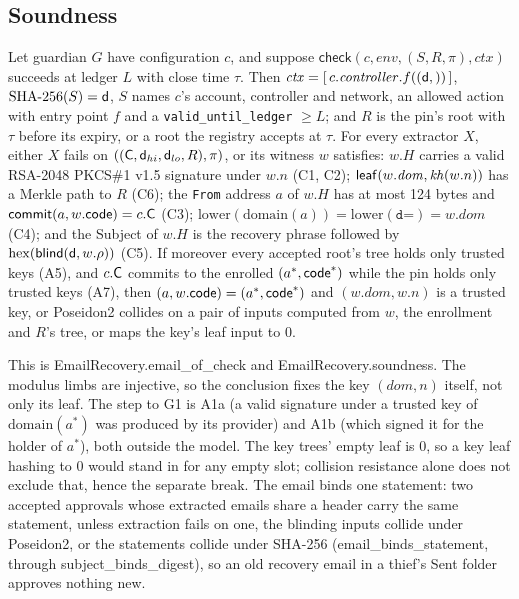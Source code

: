 \subsection{Soundness}

\begin{theorem}\label{thm:soundness}
Let guardian $G$ have configuration $c$, and suppose
$\mathsf{check}(c, \mathit{env}, (S, R, \pi), \mathit{ctx})$ succeeds at
ledger $L$ with close time $\tau$. Then $\mathit{ctx} =
[\,c.\mathit{controller}.f((\mathsf{d},))\,]$, $\mathrm{SHA\text{-}256}(S) = \mathsf{d}$, $S$ names
$c$'s account, controller and network, an allowed action with entry point
$f$ and a \texttt{valid\_until\_ledger} $\ge L$; and $R$ is the pin's root
with $\tau$ before its expiry, or a root the registry accepts at $\tau$. For
every extractor $X$, either $X$ fails on $((\mathsf{C}, \mathsf{d}_{hi},
\mathsf{d}_{lo}, R), \pi)$, or its witness $w$ satisfies: $w.H$ carries a valid
RSA-2048 PKCS\#1 v1.5 signature under $w.n$ (C1, C2);
$\mathsf{leaf}(w.\mathit{dom}, \mathit{kh}(w.n))$ has a Merkle path to $R$ (C6); the
\texttt{From} address $a$ of $w.H$ has at most 124 bytes and $\mathsf{commit}(a,
w.\mathsf{code}) = c.\mathsf{C}$ (C3); $\mathrm{lower}(\mathrm{domain}(a)) =
\mathrm{lower}(\texttt{d=}) = w.\mathit{dom}$ (C4); and the Subject of $w.H$
is the recovery phrase followed by $\mathrm{hex}(\mathsf{blind}(\mathsf{d},
w.\rho))$ (C5). If moreover every accepted root's tree holds only trusted
keys (A5), and $c.\mathsf{C}$ commits to the enrolled $(a^\ast, \mathsf{code}^\ast)$ while
the pin holds only trusted keys (A7), then $(a, w.\mathsf{code}) = (a^\ast,
\mathsf{code}^\ast)$ and $(w.\mathit{dom}, w.n)$ is a trusted key, or Poseidon2
collides on a pair of inputs computed from $w$, the enrollment and $R$'s
tree, or maps the key's leaf input to $0$.
\end{theorem}
This is \textsf{EmailRecovery.\allowbreak email\_of\_check} and
\textsf{EmailRecovery.\allowbreak soundness}. The modulus
limbs are injective, so the conclusion fixes the key $(\mathit{dom}, n)$
itself, not only its leaf. The step to G1 is A1a (a valid signature under a
trusted key of $\mathrm{domain}(a^\ast)$ was produced by its provider) and
A1b (which signed it for the holder of $a^\ast$), both outside the model.
The key trees' empty leaf is $0$, so a key leaf hashing to $0$ would stand
in for any empty slot; collision resistance alone does not exclude that,
hence the separate break. The email binds one statement: two accepted approvals whose extracted emails
share a header carry the same statement, unless extraction fails on one, the
blinding inputs collide under Poseidon2, or the statements collide under
SHA-256 (\textsf{email\_binds\_statement}, through
\textsf{subject\_binds\_digest}), so an old recovery email in a thief's Sent
folder approves nothing new.

